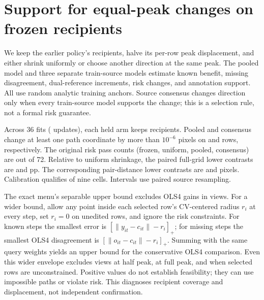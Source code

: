 \section{Support for equal-peak changes on frozen recipients}
We keep the earlier policy's recipients, halve its per-row peak
displacement, and either shrink uniformly or choose another
direction at the same peak. The pooled model and three separate
train-source models estimate known benefit, missing disagreement,
dual-reference increments, risk changes, and annotation support.
All use random analytic training anchors. Source consensus changes
direction only when every train-source model supports the change;
this is a selection rule, not a formal risk guarantee.

Across 36 fits (\FixedSupportUpdates{} updates), each held arm
keeps \FixedSupportEdits{} recipients. Pooled and consensus
change at least one path coordinate by more than $10^{-6}$ pixels
on \FixedSupportPooled{} and \FixedSupportConsensus{} rows,
respectively. The original
risk pass counts (frozen, uniform, pooled, consensus) are
\FixedSupportPasses{} out of 72. Relative to uniform shrinkage,
the paired full-grid lower contrasts are \FixedSupportPoolEffect{}
and \FixedSupportSupportEffect{} pp. The corresponding pair-distance
lower contrasts are \FixedSupportPoolPair{} and
\FixedSupportSupportPair{} pixels. Calibration qualifies
\FixedSupportQual{} of nine cells. Intervals use paired
source resampling.

The exact menu's separable upper bound excludes OLS4 gains in
\FixedSupportMenuExcluded{} views. For a wider bound, allow any
point inside each selected row's CV-centered radius $r_i$ at every
step, set $r_i=0$ on unedited rows, and ignore the risk constraints.
For known steps the smallest error is
$[\lVert y_{it}-c_{it}\rVert-r_i]_+$; for missing steps the
smallest OLS4 disagreement is $[\lVert o_{it}-c_{it}\rVert-r_i]_+$.
Summing with the same query weights yields an upper bound for the
conservative OLS4 comparison. Even this wider envelope excludes
\FixedSupportHalfExcluded{} views at half peak, \FixedSupportFullExcluded{}
at full peak, and \FixedSupportFreeExcluded{} when selected rows
are unconstrained. Positive values do not establish feasibility;
they can use impossible paths or violate risk. This diagnoses
recipient coverage and displacement, not independent confirmation.
